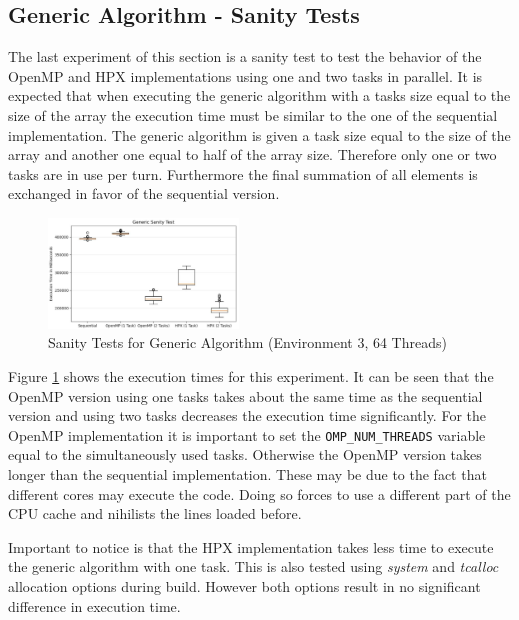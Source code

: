 \subsection{Generic Algorithm - Sanity Tests}
The last experiment of this section is a sanity test to test the behavior of the OpenMP and HPX implementations using one and two tasks in parallel.
It is expected that when executing the generic algorithm with a tasks size equal to the size of the array the execution time must be similar to the one of the sequential implementation.
The generic algorithm is given a task size equal to the size of the array and another one equal to half of the array size.
Therefore only one or two tasks are in use per turn.
Furthermore the final summation of all elements is exchanged in favor of the sequential version.
\begin{figure}[h]
	\centering
	\includegraphics[width=0.45\textwidth]{figures/sanity.jpg}
	\caption{Sanity Tests for Generic Algorithm (Environment 3, 64 Threads)}
	\label{fig:sanity}
\end{figure}

Figure \ref{fig:sanity} shows the execution times for this experiment.
It can be seen that the OpenMP version using one tasks takes about the same time as the sequential version and using two tasks decreases the execution time significantly.
For the OpenMP implementation it is important to set the \texttt{OMP\_NUM\_THREADS} variable equal to the simultaneously used tasks.
Otherwise the OpenMP version takes longer than the sequential implementation.
These may be due to the fact that different cores may execute the code.
Doing so forces to use a different part of the CPU cache and nihilists the lines loaded before.

Important to notice is that the HPX implementation takes less time to execute the generic algorithm with one task.
This is also tested using \textit{system} and \textit{tcalloc} allocation options during build.
However both options result in no significant difference in execution time.
